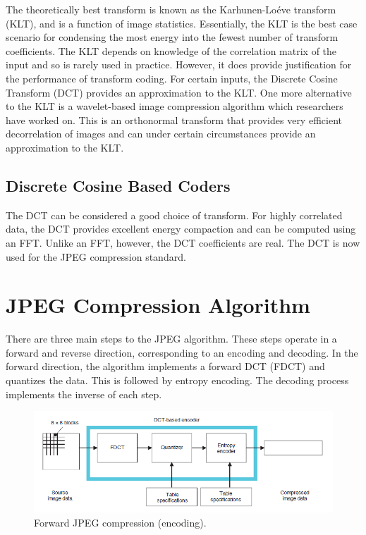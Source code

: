 \documentclass[11pt,a4paper]{article}
\begin{document}
The theoretically best transform is known as the Karhunen-Lo\'eve transform (KLT), and is a function of image statistics. Essentially, the KLT is the best case scenario for condensing the most energy into the fewest number of transform coefficients. The KLT depends on knowledge of the correlation matrix of the input and so is rarely used in practice. However, it does provide justification for the performance of transform coding. For certain inputs, the Discrete Cosine Transform (DCT) provides an approximation to the KLT. One more alternative to the KLT is a wavelet-based image compression algorithm which researchers have worked on. This is an orthonormal transform that provides very efficient decorrelation of images and can under certain circumstances provide an approximation to the KLT.

\subsection{Discrete Cosine Based Coders}
The DCT can be considered a good choice of transform. For highly correlated data, the DCT provides excellent energy compaction and can be computed using an FFT. Unlike an FFT, however, the DCT coefficients are real. The DCT is now used for the JPEG compression standard.

\pagebreak

\section{JPEG Compression Algorithm}
There are three main steps to the JPEG algorithm. These steps operate in a forward and reverse direction, corresponding to an encoding and decoding. In the forward direction, the algorithm implements a forward DCT (FDCT) and quantizes the data. This is followed by entropy encoding. The decoding process implements the inverse of each step.

\begin{figure}[ht]
\centering
\includegraphics[width=\textwidth]{forward}
\caption{Forward JPEG compression (encoding).}
\end{figure}
\end{document}
